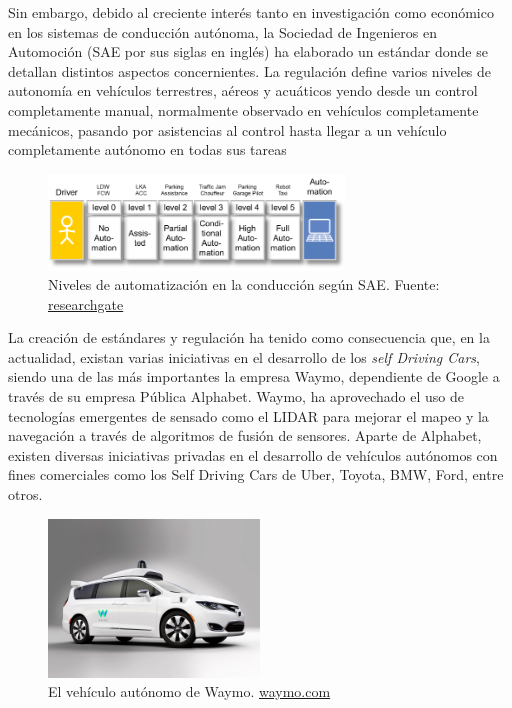 \documentclass[12pt,letterpaper]{article}
\begin{document}
Sin embargo, debido al creciente interés tanto en investigación como económico en los sistemas de conducción 
autónoma, la Sociedad de Ingenieros en Automoción (SAE por sus siglas en inglés) ha elaborado un estándar donde se 
detallan distintos aspectos concernientes. La regulación define varios niveles de autonomía en 
vehículos terrestres, aéreos y acuáticos yendo desde un control completamente manual, 
normalmente observado en vehículos completamente mecánicos, pasando por asistencias al control 
hasta llegar a un vehículo completamente autónomo en todas sus tareas

\begin{figure}[!h] 
\centering
\includegraphics[width=0.70\textwidth]{levels}
\caption{Niveles de automatización en la conducción según SAE. 
        Fuente: \href{https://www.researchgate.net/figure/Terms-related-to-automated-driving-according-to-SAE-and-VDA_fig1_273883061}{researchgate} }
\label{fig:levels}
\end{figure}

La creación de estándares y regulación ha tenido como consecuencia que, en la actualidad, existan varias iniciativas 
en el desarrollo de los \textit{self Driving Cars}, siendo una de las más 
importantes la empresa Waymo, dependiente de Google a través de su empresa Pública Alphabet. Waymo, ha aprovechado 
el uso de tecnologías emergentes de sensado como el LIDAR para mejorar el mapeo y la navegación a través de algoritmos 
de fusión de sensores. Aparte de Alphabet, existen diversas iniciativas privadas en el desarrollo de vehículos autónomos 
con fines comerciales como los Self Driving Cars de Uber, Toyota, BMW, Ford, entre otros.


\begin{figure}[!h] 
\centering
\includegraphics[width=0.5\textwidth]{waymo}
\caption{El vehículo autónomo de Waymo. 
        \href{https://waymo.com/}{waymo.com}}
\label{fig:waymo}
\end{figure}
\end{document}
